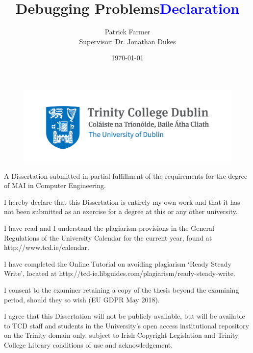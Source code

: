 \documentclass[12pt]{extarticle}
\begin{document}
\doublespacing

\title{\textbf{Debugging Problems}}
\author{Patrick Farmer\\ Supervisor: Dr. Jonathan Dukes}
\date{\today}
\maketitle

\begin{figure}[H]
\centering
\includegraphics[width=0.7\linewidth]{Images/Trinity_Main_Logo.jpg}
\label{fig:logo}
\end{figure}

\begin{center}
\large A Dissertation submitted in partial fulfillment of the requirements for the degree of MAI in Computer Engineering.
\end{center}

\newpage
\title {\Huge \textbf{\textcolor{blue}{Declaration}}}

\vspace{0.5cm}
\small I hereby declare that this Dissertation is entirely my own work and that it has not been submitted as an exercise for a degree at this or any other university.

\vspace{0.5cm}
\small I have read and I understand the plagiarism provisions in the General Regulations of the University Calendar for the current year, found at http://www.tcd.ie/calendar.
\vspace{0.5cm}

\small I have completed the Online Tutorial on avoiding plagiarism `Ready Steady Write', located at http://tcd-ie.libguides.com/plagiarism/ready-steady-write.
\vspace{0.5cm}

\small I consent to the examiner retaining a copy of the thesis beyond the examining period, should they so wish (EU GDPR May 2018).
\vspace{0.5cm}

\small I agree that this Dissertation will not be publicly available, but will be available to TCD staff and students in the University’s open access institutional repository on the Trinity domain only, subject to Irish Copyright Legislation and Trinity College Library conditions of use and acknowledgement.
\vspace{2cm}
\end{document}
